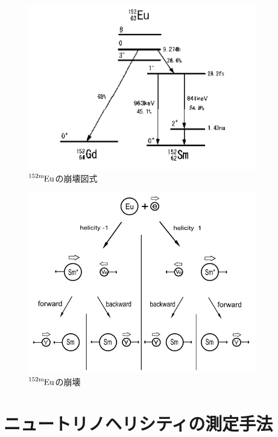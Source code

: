 \documentclass[dvipdfmx]{jreport}
\begin{document}
\begin{figure}[htbp]
  \begin{center}
    \includegraphics[width=100mm]{figure/decay_chain.png}
    \caption{$\ce{^{152\mathrm{m}}Eu}$の崩壊図式}
  \end{center}
\end{figure}
\begin{figure}[htbp]
  \begin{center}
    \includegraphics[width=100mm]{figure/helicity_structure.png}
    \caption{$\ce{^{152\mathrm{m}}Eu}$の崩壊 \label{helicity_structure}}
  \end{center}
\end{figure}

\section{ニュートリノヘリシティの測定手法}
\end{document}
